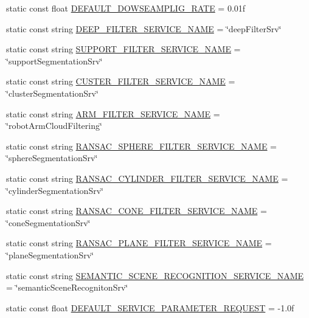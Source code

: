 \begin{DoxyCompactItemize}
\item 
static const float \hyperlink{classpcm_1_1PCManager_a21a35f215779915eda52dbf8d77f1e9f}{D\-E\-F\-A\-U\-L\-T\-\_\-\-D\-O\-W\-S\-E\-A\-M\-P\-L\-I\-G\-\_\-\-R\-A\-T\-E} = 0.\-01f
\item 
static const string \hyperlink{classpcm_1_1PCManager_a7b27780310ab92ef590d97929896688a}{D\-E\-E\-P\-\_\-\-F\-I\-L\-T\-E\-R\-\_\-\-S\-E\-R\-V\-I\-C\-E\-\_\-\-N\-A\-M\-E} = \char`\"{}deep\-Filter\-Srv\char`\"{}
\item 
static const string \hyperlink{classpcm_1_1PCManager_a82696a50e4e95dcae34c465caafa8a68}{S\-U\-P\-P\-O\-R\-T\-\_\-\-F\-I\-L\-T\-E\-R\-\_\-\-S\-E\-R\-V\-I\-C\-E\-\_\-\-N\-A\-M\-E} = \char`\"{}support\-Segmentation\-Srv\char`\"{}
\item 
static const string \hyperlink{classpcm_1_1PCManager_ab2fe91fe09f65cc853583288d980d20c}{C\-U\-S\-T\-E\-R\-\_\-\-F\-I\-L\-T\-E\-R\-\_\-\-S\-E\-R\-V\-I\-C\-E\-\_\-\-N\-A\-M\-E} = \char`\"{}cluster\-Segmentation\-Srv\char`\"{}
\item 
static const string \hyperlink{classpcm_1_1PCManager_ad73d07cb8049c2c4bd4920f0ba487560}{A\-R\-M\-\_\-\-F\-I\-L\-T\-E\-R\-\_\-\-S\-E\-R\-V\-I\-C\-E\-\_\-\-N\-A\-M\-E} = \char`\"{}robot\-Arm\-Cloud\-Filtering\char`\"{}
\item 
static const string \hyperlink{classpcm_1_1PCManager_aea7aa7ebedbbd00fd62a5d8a53fca5d3}{R\-A\-N\-S\-A\-C\-\_\-\-S\-P\-H\-E\-R\-E\-\_\-\-F\-I\-L\-T\-E\-R\-\_\-\-S\-E\-R\-V\-I\-C\-E\-\_\-\-N\-A\-M\-E} = \char`\"{}sphere\-Segmentation\-Srv\char`\"{}
\item 
static const string \hyperlink{classpcm_1_1PCManager_a73e3bde06dfcad851ee7248a86d13326}{R\-A\-N\-S\-A\-C\-\_\-\-C\-Y\-L\-I\-N\-D\-E\-R\-\_\-\-F\-I\-L\-T\-E\-R\-\_\-\-S\-E\-R\-V\-I\-C\-E\-\_\-\-N\-A\-M\-E} = \char`\"{}cylinder\-Segmentation\-Srv\char`\"{}
\item 
static const string \hyperlink{classpcm_1_1PCManager_a85e82f38f2295f687a38679bfff6ae54}{R\-A\-N\-S\-A\-C\-\_\-\-C\-O\-N\-E\-\_\-\-F\-I\-L\-T\-E\-R\-\_\-\-S\-E\-R\-V\-I\-C\-E\-\_\-\-N\-A\-M\-E} = \char`\"{}cone\-Segmentation\-Srv\char`\"{}
\item 
static const string \hyperlink{classpcm_1_1PCManager_a941cdc5f6616b2b5553f85c022772d21}{R\-A\-N\-S\-A\-C\-\_\-\-P\-L\-A\-N\-E\-\_\-\-F\-I\-L\-T\-E\-R\-\_\-\-S\-E\-R\-V\-I\-C\-E\-\_\-\-N\-A\-M\-E} = \char`\"{}plane\-Segmentation\-Srv\char`\"{}
\item 
static const string \hyperlink{classpcm_1_1PCManager_a745b3926675463d4229a998ef6cd3c3b}{S\-E\-M\-A\-N\-T\-I\-C\-\_\-\-S\-C\-E\-N\-E\-\_\-\-R\-E\-C\-O\-G\-N\-I\-T\-I\-O\-N\-\_\-\-S\-E\-R\-V\-I\-C\-E\-\_\-\-N\-A\-M\-E} = \char`\"{}semantic\-Scene\-Recogniton\-Srv\char`\"{}
\item 
static const float \hyperlink{classpcm_1_1PCManager_a6510bbbadb5d3e2a65020d60b3d0a04b}{D\-E\-F\-A\-U\-L\-T\-\_\-\-S\-E\-R\-V\-I\-C\-E\-\_\-\-P\-A\-R\-A\-M\-E\-T\-E\-R\-\_\-\-R\-E\-Q\-U\-E\-S\-T} = -\/1.\-0f
\end{DoxyCompactItemize}
